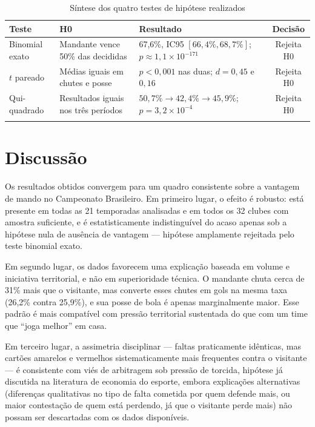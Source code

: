 \documentclass[pdflatex,sn-mathphys-num]{sn-jnl}%
\theoremstyle{thmstyleone}%
\theoremstyle{thmstyletwo}%
\theoremstyle{thmstylethree}%
\begin{document}
\begin{table}[h]
\caption{Síntese dos quatro testes de hipótese realizados}\label{tab_sintese}
\begin{tabular}{@{}p{2.3cm}p{3.5cm}p{4.3cm}c@{}}
\toprule
Teste & H0 & Resultado & Decisão\\
\midrule
Binomial exato & Mandante vence 50\% das decididas & 67,6\%, IC95 $[66{,}4\%, 68{,}7\%]$; $p \approx 1{,}1\times10^{-171}$ & Rejeita H0\\
$t$ pareado & Médias iguais em chutes e posse & $p<0{,}001$ nas duas; $d=0{,}45$ e $0{,}16$ & Rejeita H0\\
Qui-quadrado & Resultados iguais nos três períodos & $50{,}7\% \to 42{,}4\% \to 45{,}9\%$; $p=3{,}2\times10^{-4}$ & Rejeita H0\\
\botrule
\end{tabular}
\end{table}

\section{Discussão}\label{sec12}

Os resultados obtidos convergem para um quadro consistente sobre a vantagem de mando no Campeonato Brasileiro. Em primeiro lugar, o efeito é robusto: está presente em todas as 21 temporadas analisadas e em todos os 32 clubes com amostra suficiente, e é estatisticamente indistinguível do acaso apenas sob a hipótese nula de ausência de vantagem --- hipótese amplamente rejeitada pelo teste binomial exato.

Em segundo lugar, os dados favorecem uma explicação baseada em volume e iniciativa territorial, e não em superioridade técnica. O mandante chuta cerca de 31\% mais que o visitante, mas converte esses chutes em gols na mesma taxa (26,2\% contra 25,9\%), e sua posse de bola é apenas marginalmente maior. Esse padrão é mais compatível com pressão territorial sustentada do que com um time que ``joga melhor'' em casa.

Em terceiro lugar, a assimetria disciplinar --- faltas praticamente idênticas, mas cartões amarelos e vermelhos sistematicamente mais frequentes contra o visitante --- é consistente com viés de arbitragem sob pressão de torcida, hipótese já discutida na literatura de economia do esporte, embora explicações alternativas (diferenças qualitativas no tipo de falta cometida por quem defende mais, ou maior contestação de quem está perdendo, já que o visitante perde mais) não possam ser descartadas com os dados disponíveis.
\end{document}
